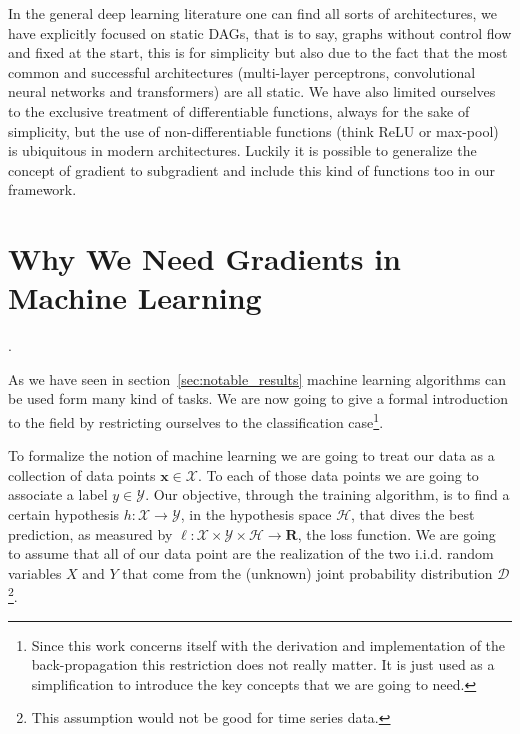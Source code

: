 \documentclass{sapthesis}
\begin{document}
In the general deep learning literature one can find all sorts of architectures,
we have explicitly focused on static DAGs, that is to say, graphs without
control flow and fixed at the start, this is for simplicity but also due to the
fact that the most common and successful architectures (multi-layer perceptrons,
convolutional neural networks and transformers) are all static. We have also
limited ourselves to the exclusive treatment of differentiable functions, always
for the sake of simplicity, but the use of non-differentiable functions (think
ReLU or max-pool) is ubiquitous in modern architectures. Luckily it is possible to
generalize the concept of gradient to subgradient and include this kind of
functions too in our framework.

\iffalse
Finally, since in deep learning it is common to use non-differentiable functions
such as ReLU or max-pool, taking advantage of the approach used in this work,
obtaining these functions will not be a problem since it is possible to
generalize the concept of gradient to subgradient.
\fi

\appendix

\iffalse
\chapter{Why We Need Gradients in Machine Learning}


\cite{jung2022, goodfellow2016, shalev-shwartz2014}.

As we have seen in section~\ref{sec:notable_results} machine learning algorithms
can be used form many kind of tasks. We are now going to give a formal
introduction to the field by restricting ourselves to the classification
case\footnote{Since this work concerns itself with the derivation and
implementation of the back-propagation this restriction does not really matter.
It is just used as a simplification to introduce the key concepts that we are
going to need.}.

To formalize the notion of machine learning we are going to treat our data as a
collection of data points $\mathbf x \in \mathcal X$. To each of those data
points we are going to associate a label $y \in \mathcal Y$. Our objective,
through the training algorithm, is to find a certain hypothesis $h : \mathcal X
\to \mathcal Y$, in the hypothesis space $\mathcal H$, that dives the best
prediction, as measured by $\ell : \mathcal X \times \mathcal Y \times \mathcal
H \to \mathbf R$, the loss function. We are going to assume that all of our data
point are the realization of the two i.i.d. random variables $X$ and $Y$ that
come from the (unknown) joint probability distribution $\mathcal
D$\footnote{This assumption would not be good for time series data.}.
\end{document}
